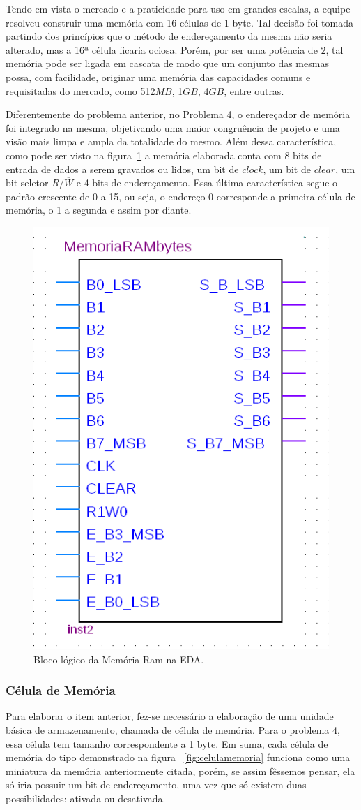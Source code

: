 \documentclass[12pt]{article}
\begin{document}
Tendo em vista o mercado e a praticidade para uso em grandes escalas, a equipe resolveu construir uma memória com 16 células de 1 byte. Tal decisão foi tomada partindo dos princípios que o método de endereçamento da mesma não seria alterado, mas a 16ª célula ficaria ociosa. Porém, por ser uma potência de $2$, tal memória pode ser ligada em cascata de modo que um conjunto das mesmas possa, com facilidade, originar uma memória das capacidades comuns e requisitadas do mercado, como 512$MB$, 1$GB$, 4$GB$, entre outras.

Diferentemente do problema anterior, no Problema 4, o endereçador de memória foi integrado na mesma, objetivando uma maior congruência de projeto e uma visão mais limpa e ampla da totalidade do mesmo. Além dessa característica, como pode ser visto na figura~\ref{fig:ram15} a memória elaborada conta com 8 bits de entrada de dados a serem gravados ou lidos, um bit de $clock$, um bit de $clear$, um bit seletor $R/\overline{W}$ e 4 bits de endereçamento. Essa última característica segue o padrão crescente de 0 a 15, ou seja, o endereço 0 corresponde a primeira célula de memória, o 1 a segunda e assim por diante.


\begin{figure}[h]
\centering
\includegraphics[width=.3\textwidth]{img/ram15bytes.png}
\caption{Bloco lógico da Memória Ram na EDA.}
\label{fig:ram15}
\end{figure}

\subsubsection{Célula de Memória}

Para elaborar o item anterior, fez-se necessário a elaboração de uma unidade básica de armazenamento, chamada de célula de memória. Para o problema 4, essa célula tem tamanho correspondente a 1 byte. Em suma, cada célula de memória do tipo demonstrado na figura ~\ref{fig:celulamemoria} funciona como uma miniatura da memória anteriormente citada, porém, se assim fêssemos pensar, ela só iria possuir um bit de endereçamento, uma vez que só existem duas possibilidades: ativada ou desativada.
\end{document}
